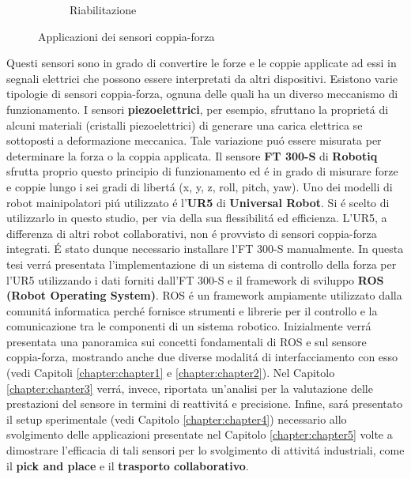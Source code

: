 \begin{figure}[H]
\begin{subfigure}[b]{0.33\textwidth}
        \caption{Riabilitazione}
        \label{fig:rehab}
    \end{subfigure}
    \caption{Applicazioni dei sensori coppia-forza}\label{fig:industrial_applications}
\end{figure}
Questi sensori sono in grado di convertire le forze e le coppie applicate ad essi in segnali elettrici che possono essere 
interpretati da altri dispositivi. 
Esistono varie tipologie di sensori coppia-forza, ognuna delle quali ha un diverso meccanismo di funzionamento. 
I sensori \textbf{piezoelettrici}, per esempio, sfruttano la propriet\'{a} di alcuni materiali (cristalli piezoelettrici) 
di generare una carica elettrica se sottoposti a deformazione meccanica. Tale variazione  
pu\'{o} essere misurata per determinare la forza o la coppia applicata.
Il sensore \textbf{FT 300-S} di \textbf{Robotiq} sfrutta proprio questo principio di funzionamento ed \'{e} in grado di misurare 
forze e coppie lungo i sei gradi di libert\'{a} (x, y, z, roll, pitch, yaw). 
Uno dei modelli di robot mainipolatori pi\'{u} utilizzato \'{e} l'\textbf{UR5} di \textbf{Universal Robot}. Si \'{e} scelto di 
utilizzarlo in questo studio, per via della sua flessibilit\'{a} ed efficienza. 
L'UR5, a differenza di altri robot collaborativi, non \'{e} provvisto di sensori coppia-forza integrati. \'{E} stato dunque necessario 
installare l'FT 300-S manualmente. 
In questa tesi verr\'{a} presentata l'implementazione di un sistema di controllo della forza per l'UR5 utilizzando i dati
forniti dall'FT 300-S e il framework di sviluppo \textbf{ROS (Robot Operating System)}.
ROS \'{e} un framework ampiamente utilizzato dalla comunit\'{a} informatica perch\'{e} fornisce strumenti e librerie 
per il controllo e la comunicazione tra le componenti di un sistema robotico. Inizialmente verr\'{a} presentata una panoramica 
sui concetti fondamentali di ROS e sul sensore coppia-forza, mostrando anche due diverse modalit\'{a} di interfacciamento con esso 
(vedi Capitoli \ref{chapter:chapter1} e \ref{chapter:chapter2}).
Nel Capitolo \ref{chapter:chapter3} verr\'{a}, invece, riportata un'analisi per la valutazione delle prestazioni del sensore in termini di 
reattivit\'{a} e precisione. Infine, sar\'{a} presentato il setup sperimentale (vedi Capitolo \ref{chapter:chapter4}) necessario 
allo svolgimento delle applicazioni presentate nel Capitolo \ref{chapter:chapter5} volte a dimostrare l'efficacia
di tali sensori per lo svolgimento di attivit\'{a} industriali, come il \textbf{pick and place} e il \textbf{trasporto collaborativo}.
